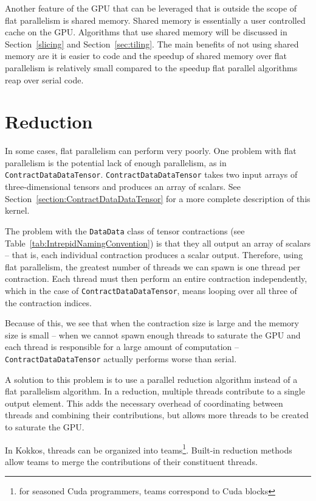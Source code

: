 Another feature of the GPU that can be leveraged that is outside the scope of
flat parallelism is shared memory. Shared memory is essentially a user controlled cache
on the GPU. Algorithms that use shared memory will be discussed in
Section~\ref{slicing} and Section~\ref{sec:tiling}. The main benefits of not
using shared memory are it is easier to code and the speedup of shared memory over flat parallelism 
is relatively small compared to the speedup flat parallel algorithms reap over
serial code. 

\section{Reduction} \label{sec:reduction}
In some cases, flat parallelism can perform very poorly.  One problem with flat
parallelism is the potential lack of enough parallelism, as in
\texttt{ContractDataDataTensor}.  \texttt{ContractDataDataTensor} takes two
input arrays of three-dimensional tensors and produces an array of scalars.  See
Section~\ref{section:ContractDataDataTensor} for a more complete description of
this kernel.

The problem with the \texttt{DataData} class of tensor contractions (see
Table~\ref{tab:IntrepidNamingConvention}) is that they all output an array of
scalars -- that is, each individual contraction produces a scalar output.
Therefore, using flat parallelism, the greatest number of threads we can spawn
is one thread per contraction.  Each thread must then perform an entire
contraction independently, which in the case of
\texttt{ContractDataDataTensor}, means looping over all three of the
contraction indices.

Because of this, we see that when the contraction size is large and the memory
size is small -- when we cannot spawn enough threads to saturate the GPU and
each thread is responsible for a large amount of computation --
\texttt{ContractDataDataTensor} actually performs worse than serial.

A solution to this problem is to use a parallel reduction algorithm instead of
a flat parallelism algorithm.  In a reduction, multiple threads contribute to a
single output element.  This adds the necessary overhead of coordinating between
threads and combining their contributions, but allows more threads to be created
to saturate the GPU.

In Kokkos, threads can be organized into teams\footnote{for seasoned Cuda
programmers, teams correspond to Cuda blocks}.  Built-in reduction methods allow
teams to merge the contributions of their constituent threads.

